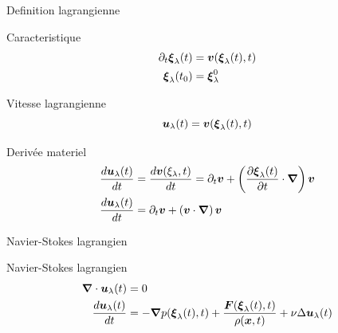 \begin{frame}{Definition lagrangienne}
 \begin{block}{Caracteristique}
\begin{align*}
 \partial_t {\boldsymbol {\xi}}_{\lambda}(t)&={\boldsymbol {v}}({\boldsymbol {\xi}}_{\lambda}(t),t)\\
 {\boldsymbol {\xi}}_{\lambda}(t_0)&={\boldsymbol {\xi}}^{0}_{\lambda}
\end{align*}
\end{block}

\begin{block}{Vitesse lagrangienne}
\begin{equation*}
 {\boldsymbol {u}}_{\lambda}(t)={\boldsymbol {v}}({\boldsymbol {\xi}}_{\lambda}(t),t)
\end{equation*}
\end{block}

\begin{block}{Derivée materiel}
\begin{align*}
\frac{d {\boldsymbol {u}}_{\lambda}(t)}{d t}&=\frac{d {\boldsymbol {v}}(\xi_{\lambda},t)}{d t}=\partial_t {\boldsymbol {v}}+\left(\frac{\partial {\boldsymbol {\xi}}_{\lambda}(t)}{\partial t}\cdot{\boldsymbol {\nabla}}\right){\boldsymbol {v}}\\
\frac{d {\boldsymbol {u}}_{\lambda}(t)}{d t}&=\partial_t {\boldsymbol {v}}+\left({\boldsymbol {v}} \cdot{\boldsymbol {\nabla}}\right){\boldsymbol {v}}
\end{align*}
 \end{block}

\end{frame}
\begin{frame}{Navier-Stokes lagrangien}
 \begin{block}{Navier-Stokes lagrangien}
 \begin{align*}
{\boldsymbol {\nabla}} \cdot {\boldsymbol {u}}_{\lambda}(t)&=0\\
\frac{d {\boldsymbol {u}}_{\lambda}(t)}{d t}&=-{\boldsymbol {\nabla}} p({\boldsymbol {\xi}}_{\lambda}(t),t)+\frac{{\boldsymbol {F}}({\boldsymbol {\xi}}_{\lambda}(t),t)}{\rho({\boldsymbol {x}},t)}+\nu \Delta {\boldsymbol {u}}_{\lambda}(t)
 \end{align*}
 \end{block}

\end{frame}


